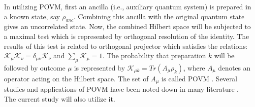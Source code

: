 \documentclass[aps,pra,twocolumn,showpacs,superscriptaddress,groupedaddress]{revtex4}
\begin{document}
In utilizing POVM, first an ancilla (i.e., auxiliary quantum system) is prepared in a known state, say $\rho_{anc}$. Combining this ancilla with the original quantum state gives an uncorrelated state. Now, the combined Hilbert space will be subjected to a maximal test which is represented by orthogonal resolution of the identity. The results of this test is related to orthogonal projector which satisfies the relations: $\mathcal{K}_\mu \mathcal{K}_\nu=\delta_{\mu\nu} \mathcal{K}_\nu$ and $\sum_\mu \mathcal{K}_\mu =1$. The probability that preparation $k$ will be followed by outcome $\mu$ is represented by $\mathcal{K}_{\mu k}=Tr(A_\mu\rho_k)$, where $A_\mu$ denotes an operator acting on the Hilbert space. The set of $A_\mu$ is called POVM \cite{MA9}. Several studies and applications of POVM have been noted down in many literature \cite{MA91,MA92,MA93,MA94}. The current study will also utilize it.
\end{document}

